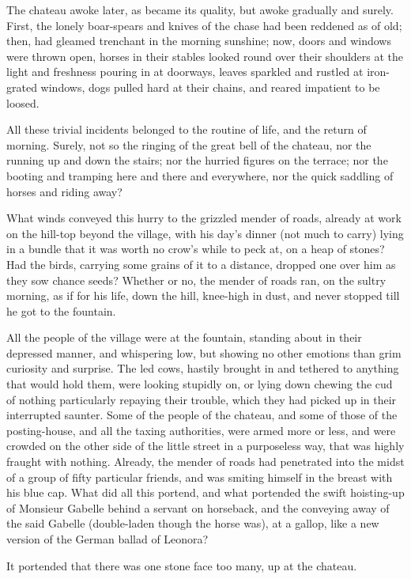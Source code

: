 The chateau awoke later, as became its quality, but awoke gradually
and surely.  First, the lonely boar-spears and knives of the chase
had been reddened as of old; then, had gleamed trenchant in the
morning sunshine; now, doors and windows were thrown open, horses
in their stables looked round over their shoulders at the light and
freshness pouring in at doorways, leaves sparkled and rustled at
iron-grated windows, dogs pulled hard at their chains, and reared
impatient to be loosed.

All these trivial incidents belonged to the routine of life, and the
return of morning.  Surely, not so the ringing of the great bell of
the chateau, nor the running up and down the stairs; nor the hurried
figures on the terrace; nor the booting and tramping here and there
and everywhere, nor the quick saddling of horses and riding away?

What winds conveyed this hurry to the grizzled mender of roads,
already at work on the hill-top beyond the village, with his day's
dinner (not much to carry) lying in a bundle that it was worth no
crow's while to peck at, on a heap of stones?  Had the birds, carrying
some grains of it to a distance, dropped one over him as they sow
chance seeds?  Whether or no, the mender of roads ran, on the sultry
morning, as if for his life, down the hill, knee-high in dust, and
never stopped till he got to the fountain.

All the people of the village were at the fountain, standing about in
their depressed manner, and whispering low, but showing no other
emotions than grim curiosity and surprise.  The led cows, hastily
brought in and tethered to anything that would hold them, were looking
stupidly on, or lying down chewing the cud of nothing particularly
repaying their trouble, which they had picked up in their interrupted
saunter.  Some of the people of the chateau, and some of those of the
posting-house, and all the taxing authorities, were armed more or less,
and were crowded on the other side of the little street in a
purposeless way, that was highly fraught with nothing.  Already,
the mender of roads had penetrated into the midst of a group of fifty
particular friends, and was smiting himself in the breast with his
blue cap.  What did all this portend, and what portended the swift
hoisting-up of Monsieur Gabelle behind a servant on horseback, and
the conveying away of the said Gabelle (double-laden though the horse
was), at a gallop, like a new version of the German ballad of Leonora?

It portended that there was one stone face too many, up at the chateau.

